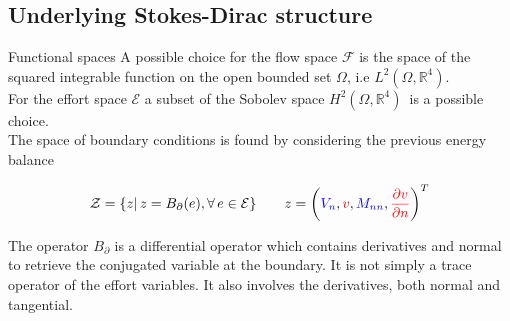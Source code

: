 \documentclass{beamer}
\begin{document}
\subsection{Underlying Stokes-Dirac structure}
\begin{frame}{Functional spaces}
A possible choice for the flow space $\mathcal{F}$ is the space of the squared integrable function on the open bounded set $\Omega$, i.e $L^2(\Omega, \mathbb{R}^4)$. \\
\vspace{5mm}
For the effort space $\mathcal{E}$ a subset of the Sobolev space $H^2(\Omega, \mathbb{R}^4) \,$ is a possible choice. \\
\vspace{5mm}
The space of boundary conditions is found by considering the previous energy balance 

\begin{equation*}
\mathcal{Z} = \{z | \, z = B_{\partial}(e), \forall \, e \in \mathcal{E} \}  \qquad z = \left( \textcolor{blue}{V_n}, \textcolor{red}{v}, \textcolor{blue}{M_{nn}}, \textcolor{red}{\diffp{v}{n}} \right)^T 
\end{equation*}

The operator $B_{\partial}$ is a differential operator which contains derivatives and normal to retrieve the conjugated variable at the boundary. It is not simply a trace operator of the effort variables. It also involves the derivatives, both normal and tangential. 

\end{frame}
 
\end{document}
